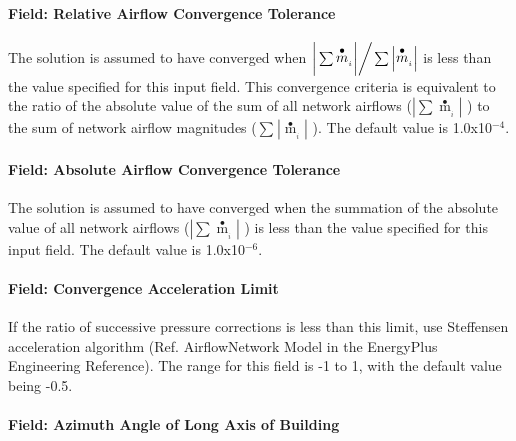 \paragraph{Field: Relative Airflow Convergence Tolerance}\label{field-relative-airflow-convergence-tolerance}

The solution is assumed to have converged when \({{\left| {\,\sum\limits_{} {{{\mathop m\limits^ \bullet }_{_i}}} } \right|} \mathord{\left/ {\vphantom {{\left| {\,\sum\limits_{} {{{\mathop m\limits^ \bullet }_{_i}}} } \right|} {\sum\limits_{} {\left| {{{\mathop m\limits^ \bullet }_{_i}}} \right|} }}} \right. } {\sum\limits_{} {\left| {{{\mathop m\limits^ \bullet }_{_i}}} \right|} }}\) is less than the value specified for this input field. This convergence criteria is equivalent to the ratio of the absolute value of the sum of all network airflows (\(\left| {\sum {{{\mathop m\limits^ \bullet }_{_i}}} } \right|\) ) to the sum of network airflow magnitudes (\(\sum\limits_{}^{} {\left| {{{\mathop m\limits^ \bullet }_{_i}}} \right|}\) ). The default value is 1.0x10\(^{-4}\).

\paragraph{Field: Absolute Airflow Convergence Tolerance}\label{field-absolute-airflow-convergence-tolerance}

The solution is assumed to have converged when the summation of the absolute value of all network airflows (\(\left| {\sum {{{\mathop m\limits^ \bullet }_{_i}}} } \right|\) ) is less than the value specified for this input field. The default value is 1.0x10\(^{-6}\).

\paragraph{Field: Convergence Acceleration Limit}\label{field-convergence-acceleration-limit}

If the ratio of successive pressure corrections is less than this limit, use Steffensen acceleration algorithm (Ref. AirflowNetwork Model in the EnergyPlus Engineering Reference). The range for this field is -1 to 1, with the default value being -0.5.

\paragraph{Field: Azimuth Angle of Long Axis of Building}\label{field-azimuth-angle-of-long-axis-of-building}


